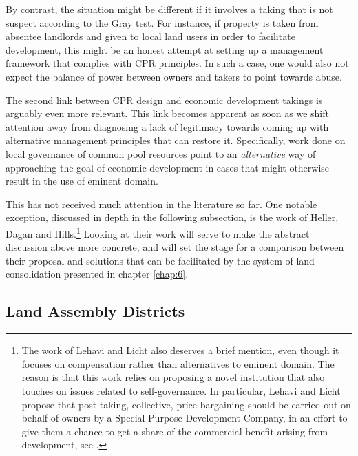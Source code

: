 By contrast, the situation might be different if it involves a taking that is not suspect according to the Gray test. For instance, if property is taken from absentee landlords and given to local land users in order to facilitate development, this might be an honest attempt at setting up a management framework that complies with CPR principles. In such a case, one would also not expect the balance of power between owners and takers to point towards abuse.

The second link between CPR design and economic development takings is arguably even more relevant. This link becomes apparent as soon as we shift attention away from diagnosing a lack of legitimacy towards coming up with alternative management principles that can restore it. Specifically, work done on local governance of common pool resources point to an {\it alternative} way of approaching the goal of economic development in cases that might otherwise result in the use of eminent domain. 

This has not received much attention in the literature so far. One notable exception, discussed in depth in the following subsection, is the work of Heller, Dagan and Hills.\footnote{The work of Lehavi and Licht also deserves a brief mention, even though it focuses on compensation rather than alternatives to eminent domain. The reason is that this work relies on proposing a novel institution that also touches on issues related to self-governance. In particular, Lehavi and Licht propose that post-taking, collective, price bargaining should be carried out on behalf of owners by a Special Purpose Development Company, in an effort to give them a chance to get a share of the commercial benefit arising from development, see \cite{lehavi07}.} Looking at their work will serve to make the abstract discussion above more concrete, and will set the stage for a comparison between their proposal and solutions that can be facilitated by the system of land consolidation presented in chapter \ref{chap:6}.

\subsection{Land Assembly Districts}\label{sec:3:6:1}

